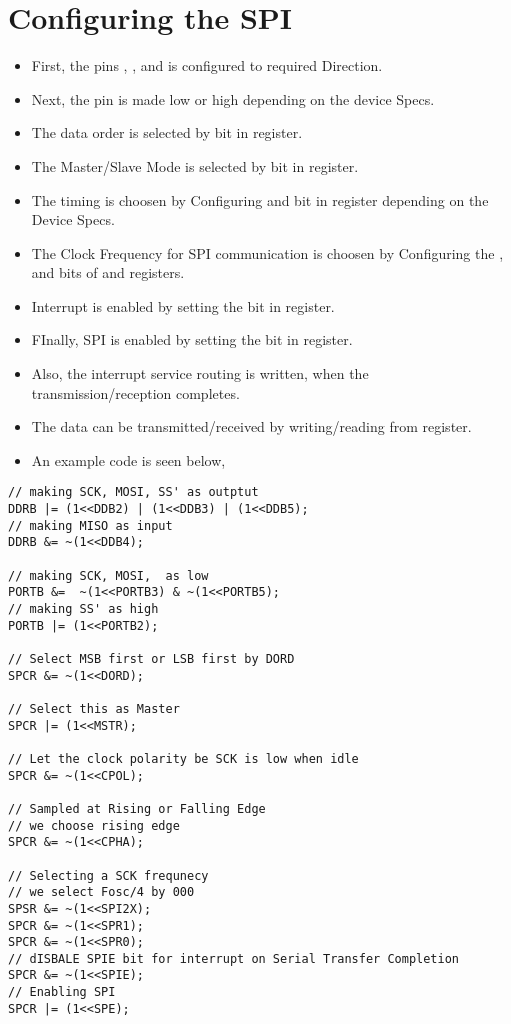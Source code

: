 \documentclass{article}
\begin{document}
\section{Configuring the SPI}
\begin{itemize}
    \item First, the pins , ,  and  is configured to required Direction.
    \item Next, the   pin is made low or high depending on the device Specs.
    \item The data order is selected by  bit in  register.
    \item The Master/Slave Mode is selected by  bit in  register.
    \item The timing is choosen by Configuring  and  bit in  register depending on the Device Specs.
    \item The Clock Frequency for SPI communication is choosen by Configuring the ,  and  bits of  and  registers.
    \item Interrupt is enabled by setting the  bit in  register.
    \item FInally, SPI is enabled by setting the  bit in  register.
    \item Also, the interrupt service routing is written, when the transmission/reception completes.
    \item The data can be transmitted/received by writing/reading from  register.
    \item An example code is seen below,
\end{itemize}

\begin{verbatim}
// making SCK, MOSI, SS' as outptut
DDRB |= (1<<DDB2) | (1<<DDB3) | (1<<DDB5);
// making MISO as input
DDRB &= ~(1<<DDB4);

// making SCK, MOSI,  as low
PORTB &=  ~(1<<PORTB3) & ~(1<<PORTB5);
// making SS' as high
PORTB |= (1<<PORTB2);

// Select MSB first or LSB first by DORD
SPCR &= ~(1<<DORD);
	
// Select this as Master
SPCR |= (1<<MSTR);

// Let the clock polarity be SCK is low when idle
SPCR &= ~(1<<CPOL);

// Sampled at Rising or Falling Edge
// we choose rising edge
SPCR &= ~(1<<CPHA);

// Selecting a SCK frequnecy
// we select Fosc/4 by 000
SPSR &= ~(1<<SPI2X);
SPCR &= ~(1<<SPR1);
SPCR &= ~(1<<SPR0);
// dISBALE SPIE bit for interrupt on Serial Transfer Completion
SPCR &= ~(1<<SPIE);
// Enabling SPI
SPCR |= (1<<SPE);
\end{verbatim}
\end{document}
